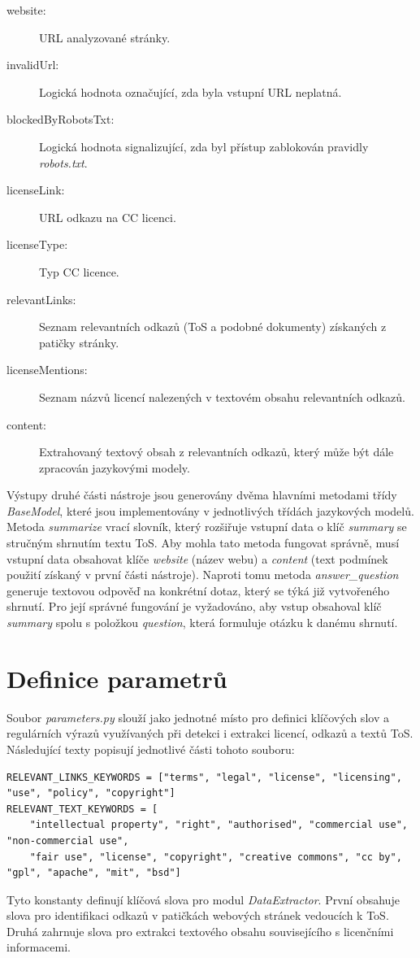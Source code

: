 \begin{description}
    \item[website:] URL analyzované stránky.
    \item[invalidUrl:] Logická hodnota označující, zda byla vstupní URL neplatná.
    \item[blockedByRobotsTxt:] Logická hodnota signalizující, zda byl přístup zablokován pravidly \textit{robots.txt}.
    \item[licenseLink:] URL odkazu na CC licenci.
    \item[licenseType:] Typ CC licence.
    \item[relevantLinks:] Seznam relevantních odkazů (ToS a podobné dokumenty) získaných z patičky stránky.
    \item[licenseMentions:] Seznam názvů licencí nalezených v textovém obsahu relevantních odkazů.
    \item[content:] Extrahovaný textový obsah z relevantních odkazů, který může být dále zpracován jazykovými modely.
\end{description}

Výstupy druhé části nástroje jsou generovány dvěma hlavními metodami třídy \textit{BaseModel}, které jsou implementovány v jednotlivých třídách jazykových modelů.
Metoda \textit{summarize} vrací slovník, který rozšiřuje vstupní data o klíč \textit{summary} se stručným shrnutím textu ToS.
Aby mohla tato metoda fungovat správně, musí vstupní data obsahovat klíče \textit{website} (název webu) a \textit{content} (text podmínek použití získaný v první části nástroje).
Naproti tomu metoda \textit{answer_question} generuje textovou odpověď na konkrétní dotaz, který se týká již vytvořeného shrnutí.
Pro její správné fungování je vyžadováno, aby vstup obsahoval klíč \textit{summary} spolu s položkou \textit{question}, která formuluje otázku k danému shrnutí.

\clearpage
\section{Definice parametrů}
\label{chap:parameters}
Soubor \textit{parameters.py} slouží jako jednotné místo pro definici klíčových slov a regulárních výrazů využívaných při detekci i extrakci licencí, odkazů a textů ToS.
Následující texty popisují jednotlivé části tohoto souboru:

\begin{lstlisting}[caption={Klíčová slova pro odkazy a textový obsah ToS},label={lst:keywords}]
RELEVANT_LINKS_KEYWORDS = ["terms", "legal", "license", "licensing", "use", "policy", "copyright"]
RELEVANT_TEXT_KEYWORDS = [
    "intellectual property", "right", "authorised", "commercial use", "non-commercial use",
    "fair use", "license", "copyright", "creative commons", "cc by", "gpl", "apache", "mit", "bsd"]
\end{lstlisting}
Tyto konstanty definují klíčová slova pro modul \textit{DataExtractor}.
První obsahuje slova pro identifikaci odkazů v patičkách webových stránek vedoucích k ToS. 
Druhá zahrnuje slova pro extrakci textového obsahu souvisejícího s licenčními informacemi.

